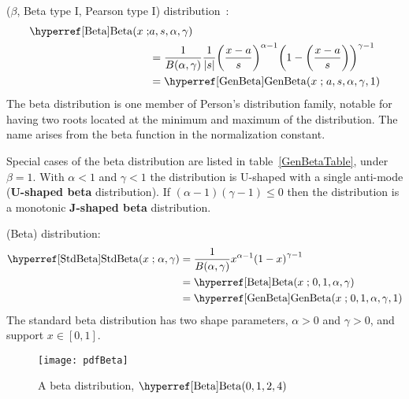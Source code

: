 

\label{sec:Beta}




 ($\beta$, Beta type I, Pearson type I) distribution~\cite{Pearson1895}:
\begin{align}
\label{Beta}
\opr{Beta}(x\given &a,s,\alpha, \gamma) \\
& = 
 \frac{1}{B(\alpha, \gamma)}\frac{1}{ \Left|s\Right|}
\Left(\frac{x-a}{s} \Right)^{\alpha -1} \Left (1-\Left(\frac{x-a}{s}\Right)\Right)^{\gamma -1}	\checked
\notag
\\ & = \opr{GenBeta}(x\given a,s,\alpha, \gamma,1) \notag						\checked
\end{align}
The beta distribution is one member of Person's distribution family, notable for having two roots located at the minimum and maximum of the distribution. The name arises from the beta function in the normalization constant.





Special cases of the beta  distribution are listed in table~\ref{GenBetaTable}, under $\beta=1$.
With $\alpha<1$ and $\gamma<1$ the distribution is U-shaped with a single anti-mode ({\bf U-shaped beta} distribution). If $(\alpha-1)(\gamma-1)\leq 0$ then the distribution is a  monotonic {\bf J-shaped beta} distribution. 


 (Beta) distribution: 
\begin{align}
\label{StdBeta}
\opr{StdBeta}(x\given \alpha, \gamma) &= 
 \frac{1}{B(\alpha, \gamma)} 
x^{\alpha-1} \Left (1- x\Right)^{\gamma -1}								\checked
\\ & = \opr{Beta}(x\given  0,1,\alpha,\gamma) \notag						\checked
\\ & = \opr{GenBeta}(x\given  0,1,\alpha,\gamma, 1) \notag				\checked
\end{align}
The standard beta distribution has two shape parameters, $\alpha>0$ and $\gamma>0$, and support $x\in[0,1]$. 

\begin{figure}[tp!]
\begin{center}
\texttt{[image: pdfBeta]}
\end{center}
\caption[Beta distribution]{A beta distribution, $\opr{Beta}(0, 1, 2, 4)$}
\end{figure}

